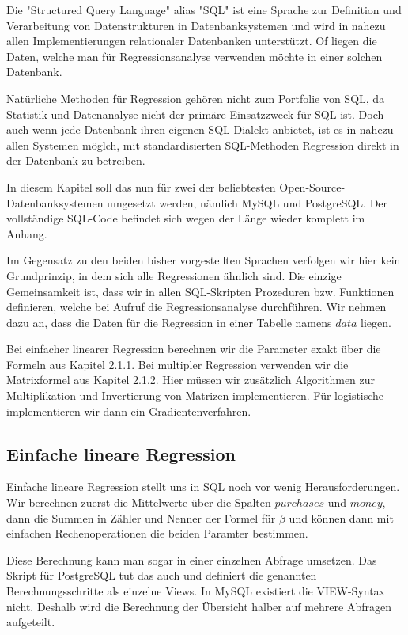 Die "Structured Query Language" alias "SQL" ist eine Sprache zur Definition und Verarbeitung von Datenstrukturen in Datenbanksystemen und wird in nahezu allen Implementierungen relationaler Datenbanken unterstützt. Of liegen die Daten, welche man für Regressionsanalyse verwenden möchte in einer solchen Datenbank.

Natürliche Methoden für Regression gehören nicht zum Portfolie von SQL, da Statistik und Datenanalyse nicht der primäre Einsatzzweck für SQL ist. Doch auch wenn jede Datenbank ihren eigenen SQL-Dialekt anbietet, ist es in nahezu allen Systemen möglch, mit standardisierten SQL-Methoden Regression direkt in der Datenbank zu betreiben.

In diesem Kapitel soll das nun für zwei der beliebtesten Open-Source-Datenbanksystemen umgesetzt werden, nämlich MySQL und PostgreSQL. Der vollständige SQL-Code befindet sich wegen der Länge wieder komplett im Anhang.

Im Gegensatz zu den beiden bisher vorgestellten Sprachen verfolgen wir hier kein Grundprinzip, in dem sich alle Regressionen ähnlich sind. Die einzige Gemeinsamkeit ist, dass wir in allen SQL-Skripten Prozeduren bzw. Funktionen definieren, welche bei Aufruf die Regressionsanalyse durchführen. Wir nehmen dazu an, dass die Daten für die Regression in einer Tabelle namens $data$ liegen.

Bei einfacher linearer Regression berechnen wir die Parameter exakt über die Formeln aus Kapitel 2.1.1. Bei multipler Regression verwenden wir die Matrixformel aus Kapitel 2.1.2. Hier müssen wir zusätzlich Algorithmen zur Multiplikation und Invertierung von Matrizen implementieren. Für logistische implementieren wir dann ein Gradientenverfahren.

\subsection{Einfache lineare Regression}

Einfache lineare Regression stellt uns in SQL noch vor wenig Herausforderungen. Wir berechnen zuerst die Mittelwerte über die Spalten $purchases$ und $money$, dann die Summen in Zähler und Nenner der Formel für $\beta$ und können dann mit einfachen Rechenoperationen die beiden Paramter bestimmen.

Diese Berechnung kann man sogar in einer einzelnen Abfrage umsetzen. Das Skript für PostgreSQL tut das auch und definiert die genannten Berechnungsschritte als einzelne Views. In MySQL existiert die VIEW-Syntax nicht. Deshalb wird die Berechnung der Übersicht halber auf mehrere Abfragen aufgeteilt.

